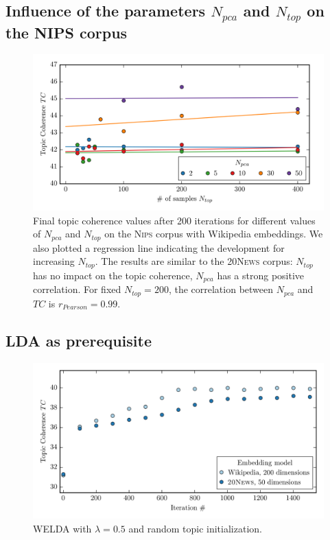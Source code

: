 \documentclass[
        a4paper,
        titlepage,
        twoside,
        parskip,
        numbers=noenddot
        ]{scrbook}
\theoremstyle{break}
\begin{document}
\begin{appendices}
  \subsection{Influence of the parameters $N_{pca}$ and $N_{top}$ on the N{\footnotesize IPS} corpus}
  \label{sec:appendix_welda_gaussian_nips_pca_samples}

  \begin{figure}[H]
         \centering
         \includegraphics[width=\textwidth]{figures/welda_gaussian_nips_pca_samples.png}
         \caption{Final topic coherence values after 200 iterations for different values of $N_{pca}$ and $N_{top}$ on the \textsc{Nips} corpus with Wikipedia embeddings. We also plotted a regression line indicating the development for increasing $N_{top}$. The results are similar to the \textsc{20News} corpus: $N_{top}$ has no impact on the topic coherence, $N_{pca}$ has a strong positive correlation. For fixed $N_{top} = 200$, the correlation between $N_{pca}$ and $TC$ is $r_{Pearson} = 0.99$.}
         \label{fig:welda_gaussian_nips_pca_samples}
  \end{figure}

  \subsection{LDA as prerequisite}
  \label{sec:appendix_lda_prerequisite}
  \begin{figure}[H]
         \centering
         \includegraphics[width=\textwidth]{figures/welda_gaussian_random_init.png}
         \caption{WELDA with $\lambda = 0.5$ and random topic initialization. }
         \label{fig:standard_lda_as_prerequisite}
  \end{figure}


\end{appendices}
\end{document}
